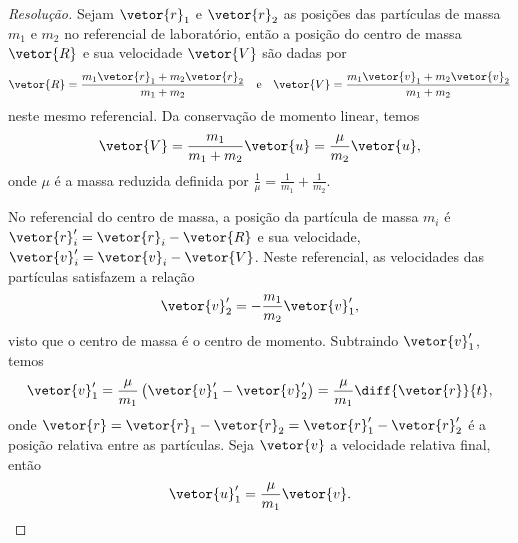 \begin{proof}[Resolução]
    Sejam \(\vetor{r}_1\) e \(\vetor{r}_2\) as posições das partículas de massa \(m_1\) e \(m_2\) no referencial de laboratório, então a posição do centro de massa \(\vetor{R}\) e sua velocidade \(\vetor{V}\) são dadas por
    \begin{equation*}
        \vetor{R} = \frac{m_1\vetor{r}_1 + m_2\vetor{r}_2}{m_1+m_2}
        \quad\text{e}\quad
        \vetor{V} = \frac{m_1\vetor{v}_1 + m_2\vetor{v}_2}{m_1+m_2}
    \end{equation*}
    neste mesmo referencial. Da conservação de momento linear, temos
    \begin{equation*}
        \vetor{V} = \frac{m_1}{m_1 + m_2}\vetor{u} = \frac{\mu}{m_2}\vetor{u},
    \end{equation*}
    onde \(\mu\) é a massa reduzida definida por \(\frac1\mu = \frac1{m_1} + \frac1{m_2}\).

    No referencial do centro de massa, a posição da partícula de massa \(m_i\) é \(\vetor{r}'_i = \vetor{r}_i - \vetor{R}\) e sua velocidade, \(\vetor{v}_i' = \vetor{v}_i - \vetor{V}\). Neste referencial, as velocidades das partículas satisfazem a relação
    \begin{equation*}
        \vetor{v}'_2 = -\frac{m_1}{m_2}\vetor{v}'_1,
    \end{equation*}
    visto que o centro de massa é o centro de momento. Subtraindo \(\vetor{v}_1'\), temos
    \begin{equation*}
        \vetor{v}_1' = \frac{\mu}{m_1}\left(\vetor{v}_1' - \vetor{v}_2'\right) = \frac{\mu}{m_1} \diff{\vetor{r}}{t},
    \end{equation*}
    onde \(\vetor{r} = \vetor{r}_1 - \vetor{r}_2 = \vetor{r}_1' - \vetor{r}_2'\) é a posição relativa entre as partículas. Seja \(\vetor{v}\) a velocidade relativa final, então
    \begin{equation*}
        \vetor{u}_1' = \frac{\mu}{m_1} \vetor{v}.
    \end{equation*}


\end{proof}
